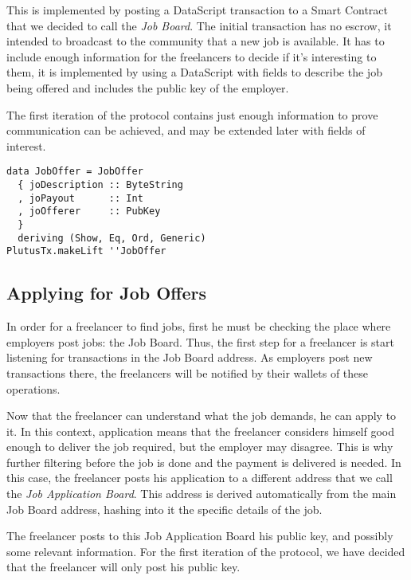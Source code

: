 \documentclass{article}
\begin{document}
This is implemented by posting a DataScript transaction to a Smart Contract that we decided to call the \emph{Job Board}. The initial transaction has no escrow, it intended to broadcast to the community that a new job is available. It has to include enough information for the freelancers to decide if it's interesting to them, it is implemented by using a DataScript with fields to describe the job being offered and includes the public key of the employer.

The first iteration of the protocol contains just enough information to prove communication can be achieved, and may be extended later with fields of interest.

\begin{samepage}
\begin{verbatim}
data JobOffer = JobOffer
  { joDescription :: ByteString
  , joPayout      :: Int
  , joOfferer     :: PubKey
  }
  deriving (Show, Eq, Ord, Generic)
PlutusTx.makeLift ''JobOffer
\end{verbatim}
\end{samepage}

\subsection{Applying for Job Offers}


In order for a freelancer to find jobs, first he must be checking the place where employers post jobs: the Job Board. Thus, the first step for a freelancer is start listening for transactions in the Job Board address. As employers post new transactions there, the freelancers will be notified by their wallets of these operations.

Now that the freelancer can understand what the job demands, he can apply to it. In this context, application means that the freelancer considers himself good enough to deliver the job required, but the employer may disagree. This is why further filtering before the job is done and the payment is delivered is needed. In this case, the freelancer posts his application to a different address that we call the \emph{Job Application Board}. This address is derived automatically from the main Job Board address, hashing into it the specific details of the job.

The freelancer posts to this Job Application Board his public key, and possibly some relevant information. For the first iteration of the protocol, we have decided that the freelancer will only post his public key.
\end{document}
